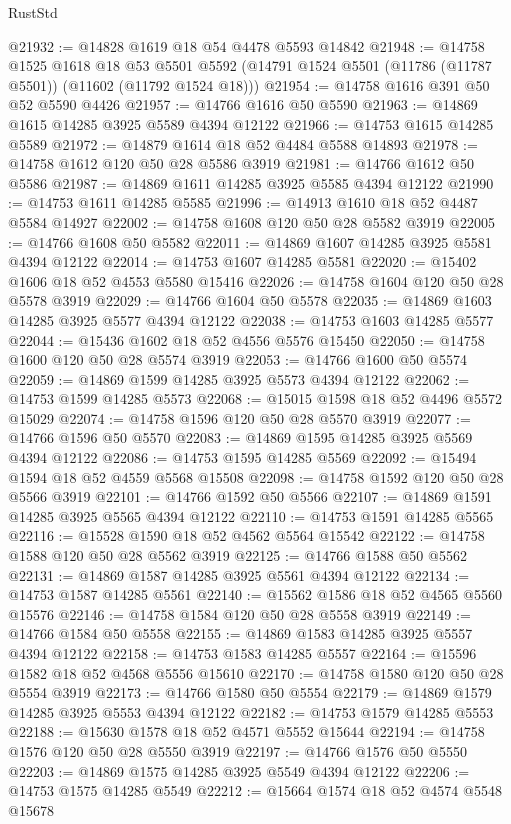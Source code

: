 \begin{lexlean}{RustStd}
\begin{coremodule}
@21932 := @14828 @1619 @18 @54 @4478 @5593 @14842
@21948 := @14758
    @1525
    @1618
    @18
    @53
    @5501
    @5592
    (@14791 @1524 @5501 (@11786 (@11787 @5501)) (@11602 (@11792 @1524 @18)))
@21954 := @14758 @1616 @391 @50 @52 @5590 @4426
@21957 := @14766 @1616 @50 @5590
@21963 := @14869 @1615 @14285 @3925 @5589 @4394 @12122
@21966 := @14753 @1615 @14285 @5589
@21972 := @14879 @1614 @18 @52 @4484 @5588 @14893
@21978 := @14758 @1612 @120 @50 @28 @5586 @3919
@21981 := @14766 @1612 @50 @5586
@21987 := @14869 @1611 @14285 @3925 @5585 @4394 @12122
@21990 := @14753 @1611 @14285 @5585
@21996 := @14913 @1610 @18 @52 @4487 @5584 @14927
@22002 := @14758 @1608 @120 @50 @28 @5582 @3919
@22005 := @14766 @1608 @50 @5582
@22011 := @14869 @1607 @14285 @3925 @5581 @4394 @12122
@22014 := @14753 @1607 @14285 @5581
@22020 := @15402 @1606 @18 @52 @4553 @5580 @15416
@22026 := @14758 @1604 @120 @50 @28 @5578 @3919
@22029 := @14766 @1604 @50 @5578
@22035 := @14869 @1603 @14285 @3925 @5577 @4394 @12122
@22038 := @14753 @1603 @14285 @5577
@22044 := @15436 @1602 @18 @52 @4556 @5576 @15450
@22050 := @14758 @1600 @120 @50 @28 @5574 @3919
@22053 := @14766 @1600 @50 @5574
@22059 := @14869 @1599 @14285 @3925 @5573 @4394 @12122
@22062 := @14753 @1599 @14285 @5573
@22068 := @15015 @1598 @18 @52 @4496 @5572 @15029
@22074 := @14758 @1596 @120 @50 @28 @5570 @3919
@22077 := @14766 @1596 @50 @5570
@22083 := @14869 @1595 @14285 @3925 @5569 @4394 @12122
@22086 := @14753 @1595 @14285 @5569
@22092 := @15494 @1594 @18 @52 @4559 @5568 @15508
@22098 := @14758 @1592 @120 @50 @28 @5566 @3919
@22101 := @14766 @1592 @50 @5566
@22107 := @14869 @1591 @14285 @3925 @5565 @4394 @12122
@22110 := @14753 @1591 @14285 @5565
@22116 := @15528 @1590 @18 @52 @4562 @5564 @15542
@22122 := @14758 @1588 @120 @50 @28 @5562 @3919
@22125 := @14766 @1588 @50 @5562
@22131 := @14869 @1587 @14285 @3925 @5561 @4394 @12122
@22134 := @14753 @1587 @14285 @5561
@22140 := @15562 @1586 @18 @52 @4565 @5560 @15576
@22146 := @14758 @1584 @120 @50 @28 @5558 @3919
@22149 := @14766 @1584 @50 @5558
@22155 := @14869 @1583 @14285 @3925 @5557 @4394 @12122
@22158 := @14753 @1583 @14285 @5557
@22164 := @15596 @1582 @18 @52 @4568 @5556 @15610
@22170 := @14758 @1580 @120 @50 @28 @5554 @3919
@22173 := @14766 @1580 @50 @5554
@22179 := @14869 @1579 @14285 @3925 @5553 @4394 @12122
@22182 := @14753 @1579 @14285 @5553
@22188 := @15630 @1578 @18 @52 @4571 @5552 @15644
@22194 := @14758 @1576 @120 @50 @28 @5550 @3919
@22197 := @14766 @1576 @50 @5550
@22203 := @14869 @1575 @14285 @3925 @5549 @4394 @12122
@22206 := @14753 @1575 @14285 @5549
@22212 := @15664 @1574 @18 @52 @4574 @5548 @15678

\end{coremodule}
\end{lexlean}
